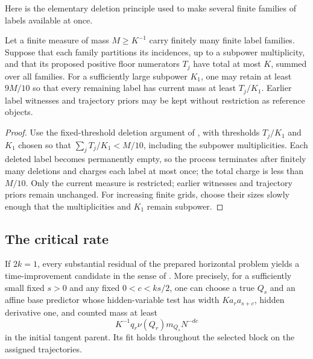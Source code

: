 Here is the elementary deletion principle used to make several finite
families of labels available at once.

\begin{lemma}
\label{a07:simultaneous-floors}
Let a finite measure of mass \(M\ge K^{-1}\) carry finitely many finite
label families.  Suppose that each family partitions its incidences, up
to a subpower multiplicity, and that its proposed positive floor
numerators \(T_j\) have total at most \(K\), summed over all families.
For a sufficiently large subpower \(K_1\), one may retain at least
\(9M/10\) so that every remaining label has current mass at least
\(T_j/K_1\).  Earlier label witnesses and trajectory priors may be kept
without restriction as reference objects.
\end{lemma}

\begin{proof}
Use the fixed-threshold deletion argument of
, with thresholds \(T_j/K_1\) and
\(K_1\) chosen so that \(\sum_jT_j/K_1<M/10\), including the
subpower multiplicities.  Each deleted label becomes permanently empty,
so the process terminates after finitely many deletions and charges each
label at most once; the total charge is less than \(M/10\).
Only the current measure is restricted; earlier witnesses and trajectory
priors remain unchanged.  For increasing finite grids, choose their sizes
slowly enough that the multiplicities and \(K_1\) remain subpower.
\end{proof}

\subsection{The critical rate}

\begin{proposition}
\label{prop:critical-rate}
If \(2k=1\), every substantial residual of the prepared horizontal
problem yields a time-improvement candidate in the sense of
.  More precisely, for a sufficiently small
fixed \(s>0\) and any fixed \(0<c<ks/2\), one can choose a true
\(Q_s\) and an affine base predictor whose hidden-variable test has
width \(K a_r a_{s+c}\), hidden derivative one, and counted mass at
least
\[
 K^{-1}q_r\nu(Q_r)m_{Q_s}N^{-dc}
\]
in the initial tangent parent.  Its fit holds throughout the selected
block on the assigned trajectories.
\end{proposition}

